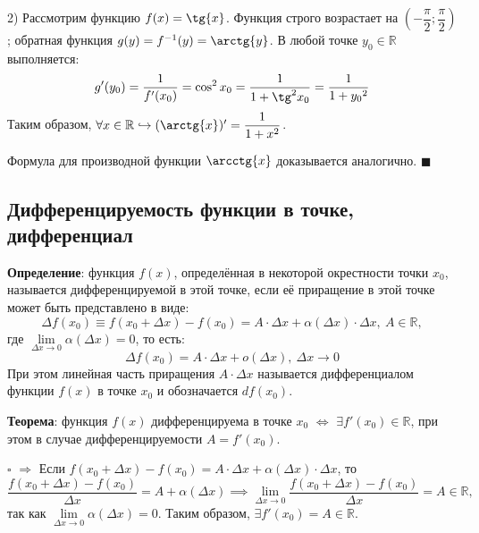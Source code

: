 \documentclass[12pt, a4paper, reqno]{article}
\begin{document}
    2) Рассмотрим функцию $f(x) = \tg{x}$. Функция строго возрастает на $\left(-\dfrac{\pi}{2};
    \dfrac{\pi}{2}\right)$; обратная функция $g(y) = f^{-1}(y) = \arctg{y}$. В любой точке
    $y_0\in\mathbb{R}$ выполняется:
    \begin{equation*}
        g'(y_0) = \dfrac{1}{f'(x_0)} = \cos^2{x_0} = \dfrac{1}{1 + \tg^2{x_0}} =
        \dfrac{1}{1 + {y_0}^2}
    \end{equation*}
    Таким образом, $\forall x\in\mathbb{R}\hookrightarrow (\arctg{x})' = \dfrac{1}{1 + x^2}$.

    Формула для производной функции $\arcctg{x}$ доказывается аналогично. $\blacksquare$

\subsection{Дифференцируемость функции в точке, дифференциал}

    \textbf{Определение}: функция $f(x)$, определённая в некоторой окрестности точки $x_0$,
    называется дифференцируемой в этой точке, если её приращение в этой точке может быть представлено
    в виде:
    \begin{equation*}
        \Delta f(x_0) \equiv f(x_0 + \Delta x) - f(x_0) = A\cdot\Delta x + \alpha(\Delta x)\cdot
        \Delta x,\ A\in\mathbb{R},
    \end{equation*}
    где $\lim\limits_{\Delta x\to 0} \alpha(\Delta x) = 0$, то есть:
    \begin{equation*}
        \Delta f(x_0) = A\cdot\Delta x + o(\Delta x),\ \Delta x\to 0
    \end{equation*}
    При этом линейная часть приращения $A\cdot\Delta x$ называется дифференциалом функции $f(x)$ в
    точке $x_0$ и обозначается $df(x_0)$.

    \textbf{Теорема}: функция $f(x)$ дифференцируема в точке $x_0$ $\iff$ $\exists
    f'(x_0)\in\mathbb{R}$, при этом в случае дифференцируемости $A = f'(x_0)$.

    $\square$ $\boxed{\Rightarrow}$ Если $f(x_0 + \Delta x) - f(x_0) = A\cdot\Delta x +
    \alpha(\Delta x)\cdot\Delta x$, то
    \begin{equation*}
        \dfrac{f(x_0 + \Delta x) - f(x_0)}{\Delta x} = A + \alpha(\Delta x) \implies
        \lim\limits_{\Delta x\to 0} \dfrac{f(x_0 + \Delta x) - f(x_0)}{\Delta x} = A\in\mathbb{R},
    \end{equation*}
    так как $\lim\limits_{\Delta x\to 0} \alpha(\Delta x) = 0$. Таким образом, $\exists f'(x_0) =
    A\in\mathbb{R}$.
\end{document}

